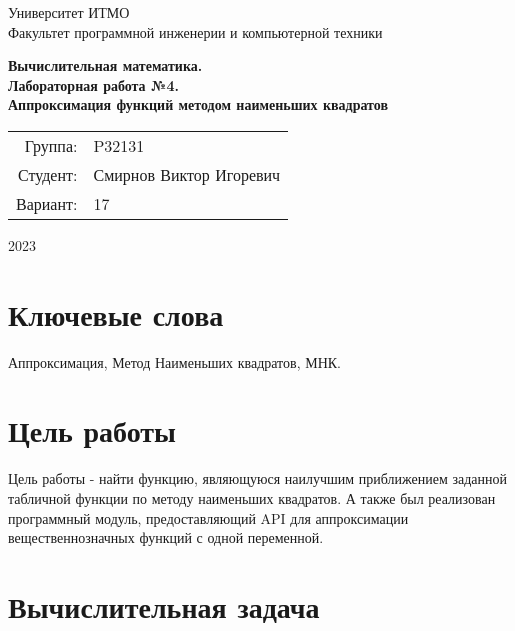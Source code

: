 \documentclass{article}
\begin{document}
\begin{titlepage}
    \begin{center}
        \begin{spacing}{1.4}
            \large{Университет ИТМО} \\
            \large{Факультет программной инженерии и компьютерной техники} \\
        \end{spacing}
        \vfill
        \textbf{
            \huge{Вычислительная математика.} \\
            \huge{Лабораторная работа №4.} \\
            \huge{Аппроксимация функций методом наименьших квадратов} \\
        }
    \end{center}
    \vfill
    \begin{center}
        \begin{tabular}{r l}
            Группа:  & P32131                  \\
            Студент: & Смирнов Виктор Игоревич \\
            Вариант: & 17                      \\
        \end{tabular}
    \end{center}
    \vfill
    \begin{center}
        \begin{large}
            2023
        \end{large}
    \end{center}
\end{titlepage}

\section*{Ключевые слова}
Аппроксимация, Метод Наименьших квадратов, МНК.

\section{Цель работы}

Цель работы - найти функцию, являющуюся наилучшим приближением
заданной табличной функции по методу наименьших квадратов.
А также был реализован программный модуль, предоставляющий API
для аппроксимации вещественнозначных функций с одной переменной.

\section{Вычислительная задача}
\end{document}
